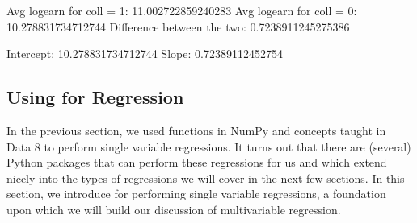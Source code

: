\documentclass[letterpaper,10pt,english]{jupyterBook}
\begin{document}
\begin{sphinxVerbatim}[commandchars=\\\{\}]
  \PYG{p}{[}  \PYG{p}{]}
  \PYG{p}{[}  \PYG{p}{]}

 
 
   
\end{sphinxVerbatim}

\begin{sphinxVerbatim}[commandchars=\\\{\}]
Avg logearn for coll = 1:  11.002722859240283
Avg logearn for coll = 0:  10.278831734712744
Difference between the two:  0.7238911245275386
\end{sphinxVerbatim}

\begin{sphinxVerbatim}[commandchars=\\\{\}]
 
 
\end{sphinxVerbatim}

\begin{sphinxVerbatim}[commandchars=\\\{\}]
Intercept:  10.278831734712744
Slope:  0.72389112452754
\end{sphinxVerbatim}


\subsection{Using  for Regression}
\label{\detokenize{content/11-econometrics/statsmodels:using-statsmodels-for-regression}}\label{\detokenize{content/11-econometrics/statsmodels::doc}}
\sphinxAtStartPar
In the previous section, we used functions in NumPy and concepts taught in Data 8 to perform single variable regressions. It turns out that there are (several) Python packages that can perform these regressions for us and which extend nicely into the types of regressions we will cover in the next few sections. In this section, we introduce  for performing single variable regressions, a foundation upon which we will build our discussion of multivariable regression.
\end{document}
